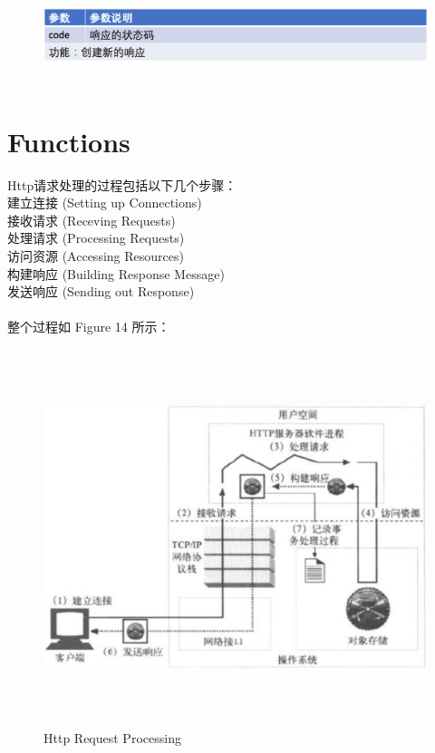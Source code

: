 \documentclass{article}
\begin{document}
	\begin{figure}[H]
		\centering
		\includegraphics[height = 2.8cm, width = 18cm]{pics/26_Response_table_3.png}	
	\end{figure}

	\section{Functions}
	\begin{CJK}{UTF8}{gbsn}
		Http请求处理的过程包括以下几个步骤：\\
		\indent 建立连接 (Setting up Connections)\\
		\indent 接收请求 (Receving Requests)\\
		\indent 处理请求 (Processing Requests)\\
		\indent 访问资源 (Accessing Resources)\\
		\indent 构建响应 (Building Response Message)\\
		\indent 发送响应 (Sending out Response)\\
		\hspace*{\fill} \\ %
		整个过程如 Figure 14 所示：
	\end{CJK}{}

	\begin{figure}[H]
		\centering
		\includegraphics[height = 11cm, width = 16cm]{pics/27_http_procedure.png}	
		\caption{Http Request Processing}
	\end{figure}
\end{document}
